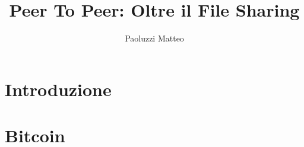 \documentclass[10pt,a4paper,twoside,draft,titlepage]{book}
\author{Paoluzzi Matteo}
\title{Peer To Peer: Oltre il File Sharing}
\begin{document}
\part{Introduzione}
\part{Bitcoin}

{}

\end{document}
